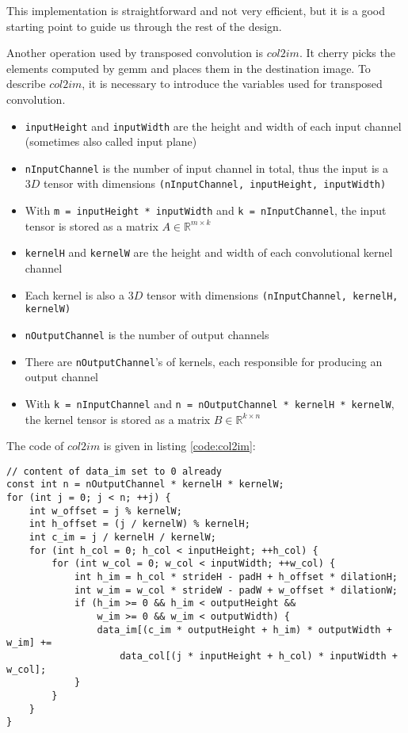 This implementation is straightforward and not very efficient, but it is a good starting point to guide
us through the rest of the design.

Another operation used by transposed convolution is $col2im$. It cherry picks the elements computed by
\gls{gemm} and places them in the destination image. To describe $col2im$, it is necessary to introduce
the variables used for transposed convolution.

\begin{itemize}
  \item \texttt{inputHeight} and \texttt{inputWidth} are the height and width of each input
    channel (sometimes also called input plane)
  \item \texttt{nInputChannel} is the number of input channel in total, thus the input is a
    $3D$ tensor with dimensions \texttt{(nInputChannel, inputHeight, inputWidth)}
  \item With \texttt{m = inputHeight * inputWidth} and \texttt{k = nInputChannel}, the input
    tensor is stored as a matrix $A \in \mathbb{R}^{m \times k}$
  \item \texttt{kernelH} and \texttt{kernelW} are the height and width of each
    convolutional kernel channel
  \item Each kernel is also a $3D$ tensor with dimensions \texttt{(nInputChannel, kernelH, kernelW)}
  \item \texttt{nOutputChannel} is the number of output channels
  \item There are \texttt{nOutputChannel}'s of kernels, each responsible for producing an output channel
  \item With \texttt{k = nInputChannel} and \texttt{n = nOutputChannel * kernelH * kernelW},
    the kernel tensor is stored as a matrix $B \in \mathbb{R}^{k \times n}$
\end{itemize}

The code of $col2im$ is given in listing \ref{code:col2im}:

\begin{code}
\begin{verbatim}
// content of data_im set to 0 already
const int n = nOutputChannel * kernelH * kernelW;
for (int j = 0; j < n; ++j) {
    int w_offset = j % kernelW;
    int h_offset = (j / kernelW) % kernelH;
    int c_im = j / kernelH / kernelW;
    for (int h_col = 0; h_col < inputHeight; ++h_col) {
        for (int w_col = 0; w_col < inputWidth; ++w_col) {
            int h_im = h_col * strideH - padH + h_offset * dilationH;
            int w_im = w_col * strideW - padW + w_offset * dilationW;
            if (h_im >= 0 && h_im < outputHeight &&
                w_im >= 0 && w_im < outputWidth) {
                data_im[(c_im * outputHeight + h_im) * outputWidth + w_im] +=
                    data_col[(j * inputHeight + h_col) * inputWidth + w_col];
            }
        }
    }
}
\end{verbatim}
\label{code:col2im}
\end{code}

